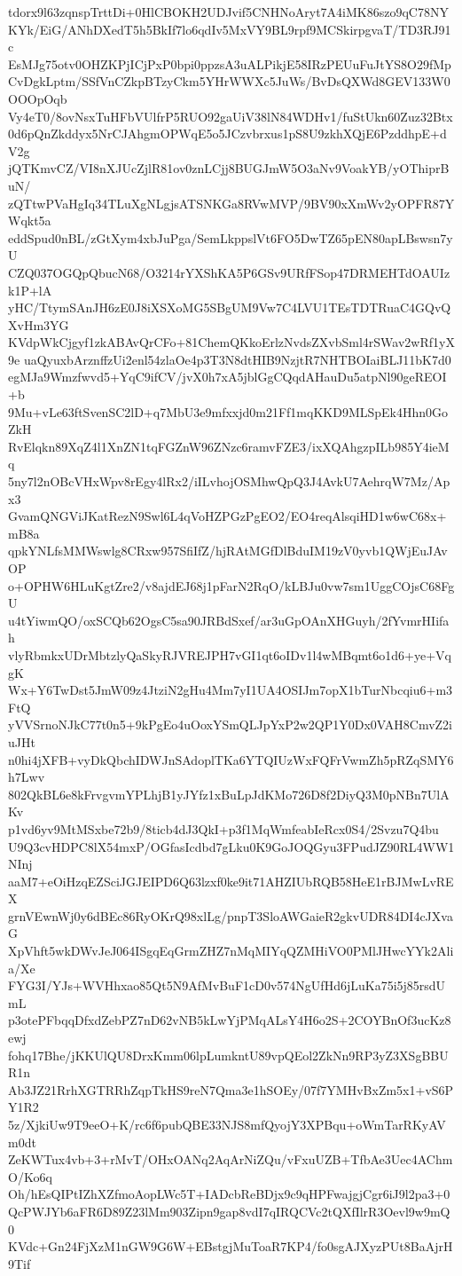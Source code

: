 tdorx9l63zqnspTrttDi+0HlCBOKH2UDJvif5CNHNoAryt7A4iMK86szo9qC78NY
KYk/EiG/ANhDXedT5h5BkIf7lo6qdIv5MxVY9BL9rpf9MCSkirpgvaT/TD3RJ91c
EsMJg75otv0OHZKPjICjPxP0bpi0ppzsA3uALPikjE58IRzPEUuFuJtYS8O29fMp
CvDgkLptm/SSfVnCZkpBTzyCkm5YHrWWXc5JuWs/BvDsQXWd8GEV133W0OOOpOqb
Vy4eT0/8ovNsxTuHFbVUlfrP5RUO92gaUiV38lN84WDHv1/fuStUkn60Zuz32Btx
0d6pQnZkddyx5NrCJAhgmOPWqE5o5JCzvbrxus1pS8U9zkhXQjE6PzddhpE+dV2g
jQTKmvCZ/VI8nXJUcZjlR81ov0znLCjj8BUGJmW5O3aNv9VoakYB/yOThiprBuN/
zQTtwPVaHgIq34TLuXgNLgjsATSNKGa8RVwMVP/9BV90xXmWv2yOPFR87YWqkt5a
eddSpud0nBL/zGtXym4xbJuPga/SemLkppslVt6FO5DwTZ65pEN80apLBswsn7yU
CZQ037OGQpQbucN68/O3214rYXShKA5P6GSv9URfFSop47DRMEHTdOAUIzk1P+lA
yHC/TtymSAnJH6zE0J8iXSXoMG5SBgUM9Vw7C4LVU1TEsTDTRuaC4GQvQXvHm3YG
KVdpWkCjgyf1zkABAvQrCFo+81ChemQKkoErlzNvdsZXvbSml4rSWav2wRf1yX9e
uaQyuxbArznffzUi2enl54zlaOe4p3T3N8dtHIB9NzjtR7NHTBOIaiBLJ11bK7d0
egMJa9Wmzfwvd5+YqC9ifCV/jvX0h7xA5jblGgCQqdAHauDu5atpNl90geREOI+b
9Mu+vLe63ftSvenSC2lD+q7MbU3e9mfxxjd0m21Ff1mqKKD9MLSpEk4Hhn0GoZkH
RvElqkn89XqZ4l1XnZN1tqFGZnW96ZNzc6ramvFZE3/ixXQAhgzpILb985Y4ieMq
5ny7l2nOBcVHxWpv8rEgy4lRx2/iILvhojOSMhwQpQ3J4AvkU7AehrqW7Mz/Apx3
GvamQNGViJKatRezN9Swl6L4qVoHZPGzPgEO2/EO4reqAlsqiHD1w6wC68x+mB8a
qpkYNLfsMMWswlg8CRxw957SfiIfZ/hjRAtMGfDlBduIM19zV0yvb1QWjEuJAvOP
o+OPHW6HLuKgtZre2/v8ajdEJ68j1pFarN2RqO/kLBJu0vw7sm1UggCOjsC68FgU
u4tYiwmQO/oxSCQb62OgsC5sa90JRBdSxef/ar3uGpOAnXHGuyh/2fYvmrHIifah
vlyRbmkxUDrMbtzlyQaSkyRJVREJPH7vGI1qt6oIDv1l4wMBqmt6o1d6+ye+VqgK
Wx+Y6TwDst5JmW09z4JtziN2gHu4Mm7yI1UA4OSIJm7opX1bTurNbcqiu6+m3FtQ
yVVSrnoNJkC77t0n5+9kPgEo4uOoxYSmQLJpYxP2w2QP1Y0Dx0VAH8CmvZ2iuJHt
n0hi4jXFB+vyDkQbchIDWJnSAdoplTKa6YTQIUzWxFQFrVwmZh5pRZqSMY6h7Lwv
802QkBL6e8kFrvgvmYPLhjB1yJYfz1xBuLpJdKMo726D8f2DiyQ3M0pNBn7UlAKv
p1vd6yv9MtMSxbe72b9/8ticb4dJ3QkI+p3f1MqWmfeabIeRcx0S4/2Svzu7Q4bu
U9Q3cvHDPC8lX54mxP/OGfasIcdbd7gLku0K9GoJOQGyu3FPudJZ90RL4WW1NInj
aaM7+eOiHzqEZSciJGJEIPD6Q63lzxf0ke9it71AHZIUbRQB58HeE1rBJMwLvREX
grnVEwnWj0y6dBEc86RyOKrQ98xlLg/pnpT3SloAWGaieR2gkvUDR84DI4cJXvaG
XpVhft5wkDWvJeJ064ISgqEqGrmZHZ7nMqMIYqQZMHiVO0PMlJHwcYYk2Alia/Xe
FYG3I/YJs+WVHhxao85Qt5N9AfMvBuF1cD0v574NgUfHd6jLuKa75i5j85rsdUmL
p3otePFbqqDfxdZebPZ7nD62vNB5kLwYjPMqALsY4H6o2S+2COYBnOf3ucKz8ewj
fohq17Bhe/jKKUlQU8DrxKmm06lpLumkntU89vpQEol2ZkNn9RP3yZ3XSgBBUR1n
Ab3JZ21RrhXGTRRhZqpTkHS9reN7Qma3e1hSOEy/07f7YMHvBxZm5x1+vS6PY1R2
5z/XjkiUw9T9eeO+K/rc6f6pubQBE33NJS8mfQyojY3XPBqu+oWmTarRKyAVm0dt
ZeKWTux4vb+3+rMvT/OHxOANq2AqArNiZQu/vFxuUZB+TfbAe3Uec4AChmO/Ko6q
Oh/hEsQIPtIZhXZfmoAopLWc5T+IADcbReBDjx9c9qHPFwajgjCgr6iJ9l2pa3+0
QcPWJYb6aFR6D89Z23lMm903Zipn9gap8vdI7qIRQCVc2tQXfIlrR3Oevl9w9mQ0
KVdc+Gn24FjXzM1nGW9G6W+EBstgjMuToaR7KP4/fo0sgAJXyzPUt8BaAjrH9Tif
